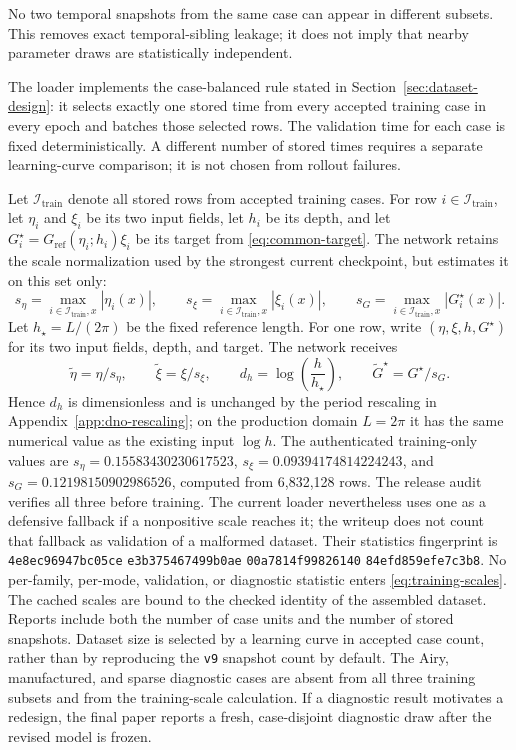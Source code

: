 \documentclass[11pt]{article}
\begin{document}
No two temporal snapshots from the same case can appear in different
subsets.  This removes exact temporal-sibling leakage; it does not imply that
nearby parameter draws are statistically independent.

The loader implements the case-balanced rule stated in
Section~\ref{sec:dataset-design}: it selects exactly one stored time from
every accepted training case in every epoch and batches those selected rows.
The validation time for each case is fixed deterministically.  A different
number of stored times requires a separate learning-curve comparison; it is
not chosen from rollout failures.

Let $\mathcal I_{\mathrm{train}}$ denote all stored rows from accepted
training cases.  For row $i\in\mathcal I_{\mathrm{train}}$, let $\eta_i$ and
$\xi_i$ be its two input fields, let $h_i$ be its depth, and let
$G_i^\star=G_{\mathrm{ref}}(\eta_i;h_i)\xi_i$ be its target from
\eqref{eq:common-target}.  The network retains the scale normalization used by
the strongest current checkpoint, but estimates it on this set only:
\begin{equation}
  s_\eta=\max_{i\in\mathcal I_{\mathrm{train}},x}|\eta_i(x)|,
  \qquad
  s_\xi=\max_{i\in\mathcal I_{\mathrm{train}},x}|\xi_i(x)|,
  \qquad
  s_G=\max_{i\in\mathcal I_{\mathrm{train}},x}|G_i^\star(x)|.
  \label{eq:training-scales}
\end{equation}
Let $h_\star=L/(2\pi)$ be the fixed reference length.  For one row, write
$(\eta,\xi,h,G^\star)$ for its two input fields, depth, and target.  The
network receives
\begin{equation}
  \widetilde\eta=\eta/s_\eta,\qquad
  \widetilde\xi=\xi/s_\xi,\qquad
  d_h=\log\!\left(\frac{h}{h_\star}\right),\qquad
  \widetilde G^\star=G^\star/s_G.
  \label{eq:network-normalization}
\end{equation}
Hence $d_h$ is
dimensionless and is unchanged by the period rescaling in
Appendix~\ref{app:dno-rescaling}; on the production domain $L=2\pi$ it has
the same numerical value as the existing input $\log h$.
The authenticated training-only values are
$s_\eta=0.15583430230617523$,
$s_\xi=0.09394174814224243$, and
$s_G=0.12198150902986526$, computed from 6,832,128 rows.  The release audit
verifies all three before training.  The current loader nevertheless
uses one as a defensive fallback if a nonpositive scale reaches it; the
writeup does not count that fallback as validation of a malformed dataset.
Their statistics fingerprint is
\texttt{4e8ec96947bc05ce}\allowbreak
\texttt{e3b375467499b0ae}\allowbreak
\texttt{00a7814f99826140}\allowbreak
\texttt{84efd859efe7c3b8}.
No per-family, per-mode, validation, or diagnostic statistic enters
\eqref{eq:training-scales}.  The cached scales are bound to the checked
identity of the assembled dataset.
Reports include both the number of case units and the number of stored
snapshots.  Dataset size is selected by a learning curve in accepted case
count, rather than by reproducing the \texttt{v9} snapshot count by default.
The Airy, manufactured, and sparse diagnostic cases are absent from all three
training subsets and from the training-scale calculation.  If a diagnostic
result motivates a redesign, the final paper reports a fresh, case-disjoint
diagnostic draw after the revised model is frozen.
\end{document}

